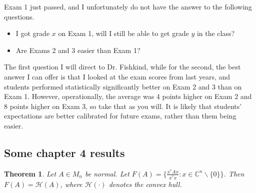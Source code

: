 \documentclass[11pt]{article}
\newcommand{\C}{\ensuremath{\mathbb C}}
\theoremstyle{plain}
\newtheorem{thm}{Theorem}[section]
\theoremstyle{definition}
\theoremstyle{remark}
\begin{document}
Exam 1 just passed, and I unfortunately do not have the answer to the following questions.
\begin{itemize}
    \item I got grade $x$ on Exam 1, will I still be able to get grade $y$ in the class?
    \item Are Exams 2 and 3 easier than Exam 1?
\end{itemize}
The first question I will direct to Dr. Fishkind, while for the second, the best answer I can offer is that I looked at the exam scores from last years, and students performed statistically significantly better on Exam 2 and 3 than on Exam 1. However, operationally, the average was 4 points higher on Exam 2 and 8 points higher on Exam 3, so take that as you will. It is likely that students' expectations are better calibrated for future exams, rather than them being easier.

\subsection*{Some chapter 4 results}

\begin{thm}
    Let $A \in M_n$ be normal. Let $F(A) = \{\frac{x^* A x}{x^* x} : x \in \C^n \backslash \{0\}\}$. Then $F(A) = \mathcal{H}(A)$, where $\mathcal{H}(\cdot)$ denotes the convex hull.
\end{thm}
\end{document}
